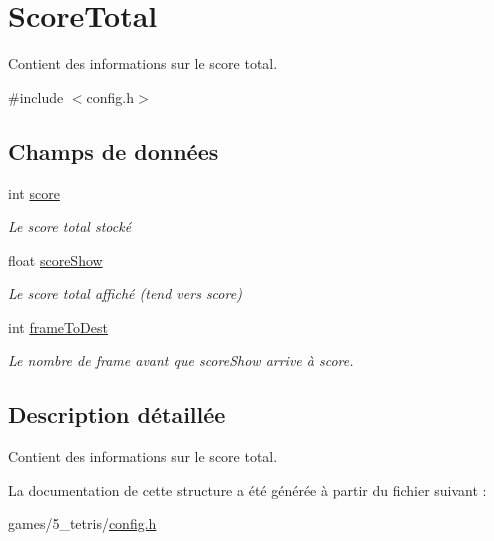 \hypertarget{structScoreTotal}{}\section{Score\+Total}
\label{structScoreTotal}


Contient des informations sur le score total.  




{\ttfamily \#include $<$config.\+h$>$}

\subsection*{Champs de données}
\begin{DoxyCompactItemize}
\item 
\mbox{\label{structScoreTotal_aef160b7437d94056f1dc59646cd5b87d}} 
int \hyperlink{structScoreTotal_aef160b7437d94056f1dc59646cd5b87d}{score}
\begin{DoxyCompactList}\small\item\em Le score total stocké \end{DoxyCompactList}\item 
\mbox{\label{structScoreTotal_a6b239c06558c3f07d941f6f3100502d7}} 
float \hyperlink{structScoreTotal_a6b239c06558c3f07d941f6f3100502d7}{score\+Show}
\begin{DoxyCompactList}\small\item\em Le score total affiché (tend vers score) \end{DoxyCompactList}\item 
\mbox{\label{structScoreTotal_a80520a66a66393c01b9be203eeb23107}} 
int \hyperlink{structScoreTotal_a80520a66a66393c01b9be203eeb23107}{frame\+To\+Dest}
\begin{DoxyCompactList}\small\item\em Le nombre de frame avant que score\+Show arrive à score. \end{DoxyCompactList}\end{DoxyCompactItemize}


\subsection{Description détaillée}
Contient des informations sur le score total. 

La documentation de cette structure a été générée à partir du fichier suivant \+:\begin{DoxyCompactItemize}
\item 
games/5\+\_\+tetris/\hyperlink{config_8h}{config.\+h}\end{DoxyCompactItemize}
